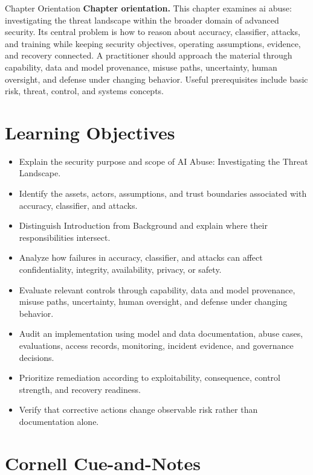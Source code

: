 \documentclass[11pt,letterpaper]{article}
\title{\CornellDocumentTitle}
\author{}
\date{}
\begin{document}
\maketitle
\begin{CornellOverviewBox}{Chapter Orientation}
\textbf{Chapter orientation.} This chapter examines ai abuse: investigating the threat landscape within the broader domain of advanced security. Its central problem is how to reason about accuracy, classifier, attacks, and training while keeping security objectives, operating assumptions, evidence, and recovery connected. A practitioner should approach the material through capability, data and model provenance, misuse paths, uncertainty, human oversight, and defense under changing behavior. Useful prerequisites include basic risk, threat, control, and systems concepts.
\end{CornellOverviewBox}
\section*{Learning Objectives}
\begin{itemize}
\item Explain the security purpose and scope of AI Abuse: Investigating the Threat Landscape.
\item Identify the assets, actors, assumptions, and trust boundaries associated with accuracy, classifier, and attacks.
\item Distinguish Introduction from Background and explain where their responsibilities intersect.
\item Analyze how failures in accuracy, classifier, and attacks can affect confidentiality, integrity, availability, privacy, or safety.
\item Evaluate relevant controls through capability, data and model provenance, misuse paths, uncertainty, human oversight, and defense under changing behavior.
\item Audit an implementation using model and data documentation, abuse cases, evaluations, access records, monitoring, incident evidence, and governance decisions.
\item Prioritize remediation according to exploitability, consequence, control strength, and recovery readiness.
\item Verify that corrective actions change observable risk rather than documentation alone.
\end{itemize}
\section*{Cornell Cue-and-Notes}
\end{document}
